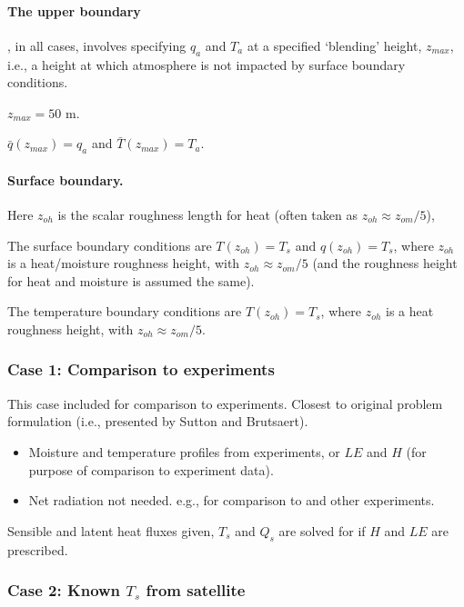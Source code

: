 \documentclass{article}
\begin{document}
    \paragraph{The upper boundary}, in all  cases, involves specifying $q_a$ and $T_a$ at a specified `blending' height, $z_{max}$, i.e., a height at which atmosphere is not impacted by surface boundary conditions.  

    $z_{max} = 50$ m. 

    $\bar q (z_{max}) = q_a$ and $\bar T (z_{max}) = T_a$.

    \paragraph{Surface boundary.}
    Here $z_{oh}$ is the scalar roughness length for heat (often taken as $z_{oh}\approx z_{om}/5$),

    
    The surface boundary conditions are $T(z_{oh}) = T_s$ and $q(z_{oh}) = T_s$,  where $z_{oh}$ is a heat/moisture roughness height, with $z_{oh} \approx  z_{om}/5$ (and the roughness height for heat and moisture is assumed the same).

    The temperature boundary conditions are $T(z_{oh}) = T_s$,  where $z_{oh}$ is a heat roughness height, with $z_{oh} \approx  z_{om}/5$.

    
    \subsubsection*{Case 1: Comparison to experiments}

    This case included for comparison to experiments.
    Closest to original problem formulation (i.e., presented by Sutton and Brutsaert).

    
    \begin{itemize}

    \item Moisture and temperature profiles from experiments, or $LE$ and $H$ (for purpose of comparison to experiment data). 
    \item Net radiation not needed. e.g., for comparison to \cite{rider1963horizontal} and other experiments. 
    \end{itemize}

    Sensible and latent heat fluxes given, $T_s$ and $Q_s$ are  solved for if $H$ and $LE$ are prescribed.

    \subsubsection*{Case 2: Known $T_s$ from satellite}
\end{document}
